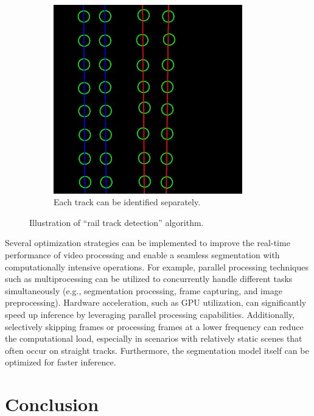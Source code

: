 \documentclass[Master,MDS,english]{BASE/twbook} %
\begin{document}
\begin{figure}[H]
\begin{subfigure}[t]{.215\textwidth}
  \centering
  \includegraphics[width=0.9\textwidth]{images/streaming/img1}
  \caption{Each track can be identified separately. }
\end{subfigure}
\caption{Illustration of ``rail track detection'' algorithm. }
\label{fig:postprocessing2}
\end{figure}


Several optimization strategies can be implemented to improve the real-time performance of video processing and enable a seamless segmentation with computationally intensive operations.
For example, parallel processing techniques such as multiprocessing can be utilized to concurrently handle different tasks simultaneously (e.g., segmentation processing, frame capturing, and image preprocessing). 
Hardware acceleration, such as GPU utilization, can significantly speed up inference by leveraging parallel processing capabilities. 
Additionally, selectively skipping frames or processing frames at a lower frequency can reduce the computational load, especially in scenarios with relatively static scenes that often occur on straight tracks. Furthermore, the segmentation model itself can be optimized for faster inference. 






\chapter{Conclusion} %
\end{document}

